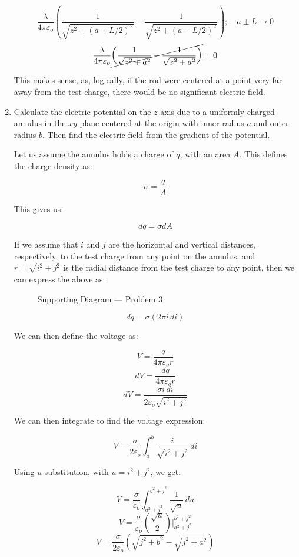 \begin{enumerate}
      $$\frac{\lambda}{4\pi\varepsilon_o}\left( \frac{1}{\sqrt{z^2+(a+L/2)^2}}-\frac{1}{\sqrt{z^2+(a-L/2)^2}} \right);\quad a\pm L\to 0$$
      $$\frac{\lambda}{4\pi\varepsilon_o}\cancel{\left( \frac{1}{\sqrt{z^2+a^2}}-\frac{1}{\sqrt{z^2+a^2}} \right)}=0$$

      This makes sense, as, logically, if the rod were centered at a point very far away from the test charge, there would be no significant electric field.
    
  \item Calculate the electric potential on the $z$-axis due to a uniformly charged annulus in the $xy$-plane centered at the origin with inner radius $a$ and outer radius $b$. Then find the electric field from the gradient of the potential.

    Let us assume the annulus holds a charge of $q$, with an area $A$. This defines the charge density as:

    $$\sigma=\frac{q}{A}$$

    This gives us:

    $$dq=\sigma dA$$

    If we assume that $i$ and $j$ are the horizontal and vertical distances, respectively, to the test charge from any point on the annulus, and $r=\sqrt{i^2+j^2}$ is the radial distance from the test charge to any point, then we can express the above as:

    \begin{figure}[H]
      \centering
      
      \caption{Supporting Diagram — Problem 3}
      \label{fig:4}
    \end{figure}

    $$dq=\sigma (2\pi i\,di)$$

    We can then define the voltage as:

    $$V=\frac{q}{4\pi\varepsilon_o r}$$
    $$dV=\frac{dq}{4\pi\varepsilon_o r}$$
    $$dV=\frac{\sigma i\,di}{2\varepsilon_o\sqrt{i^2+j^2}}$$

    We can then integrate to find the voltage expression:

    $$V=\frac{\sigma}{2\varepsilon_o}\int_a^b\frac{i}{\sqrt{i^2+j^2}}\,di$$

    Using $u$ substitution, with $u=i^2+j^2$, we get:

    $$V=\frac{\sigma}{\varepsilon_o}\int_{a^2+j^2}^{b^2+j^2}\frac{1}{\sqrt{u}}\,du$$
    $$V=\frac{\sigma}{\varepsilon_o}\left(  \frac{\sqrt{u}}{2}\right)\Big|_{a^2+j^2}^{b^2+j^2}$$
    $$V=\frac{\sigma}{2\varepsilon_o}\left(  \sqrt{j^2+b^2}-\sqrt{j^2+a^2}\right)$$


\end{enumerate}
